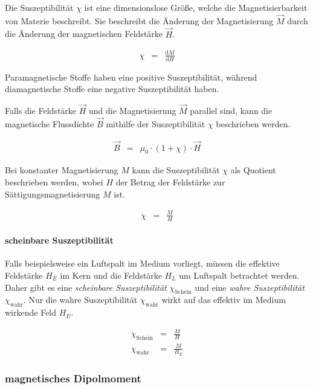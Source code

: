 \documentclass[12pt,a4paper]{scrartcl}
\numberwithin{equation}{section} %
\renewcommand{\[}{} %
\renewcommand{\]}{\noindent} %
\begin{document}
Die Suszeptibilität \(\chi\) ist eine dimensionslose Größe, welche die
Magnetisierbarkeit von Materie beschreibt. Sie beschreibt die Änderung
der Magnetisierung \(\vec M\) durch die Änderung der magnetischen
Feldstärke \(\vec H\).

\[
\begin{eqnarray}
    \chi &=& \frac{\mathrm dM}{\mathrm dH}
\end{eqnarray}
\]

Paramagnetische Stoffe haben eine positive Suszeptibilität, während
diamagnetische Stoffe eine negative Suszeptibilität haben.

Falls die Feldstärke \(\vec H\) und die Magnetisierung \(\vec M\)
parallel sind, kann die magnetische Flussdichte \(\vec B\) mithilfe der
Suszeptibilität \(\chi\) beschrieben werden.

\[
\begin{eqnarray}
    \vec B &=& \mu_0\cdot (1+\chi) \cdot \vec H
\end{eqnarray}
\]

Bei konstanter Magnetisierung \(M\) kann die Suszeptibilität \(\chi\)
als Quotient beschrieben werden, wobei \(H\) der Betrag der Feldstärke
zur Sättigungsmagnetisierung \(M\) ist.

\[
\begin{eqnarray}
    \chi &=& \frac{M}{H}
\end{eqnarray}
\]

\hypertarget{scheinbare-suszeptibilituxe4t}{%
\paragraph{scheinbare
Suszeptibilität}\label{scheinbare-suszeptibilituxe4t}}

Falls beispielsweise ein Luftspalt im Medium vorliegt, müssen die
effektive Feldstärke \(H_E\) im Kern und die Feldstärke \(H_L\) um
Luftspalt betrachtet werden. Daher gibt es eine \emph{scheinbare
Suszeptibilität} \(\chi_\mathrm{Schein}\) und eine \emph{wahre
Suszeptibilität} \(\chi_\mathrm{wahr}\). Nur die wahre Suszeptibilität
\(\chi_\mathrm{wahr}\) wirkt auf das effektiv im Medium wirkende Feld
\(H_E\).

\[
\begin{eqnarray}
    \chi_\mathrm{Schein} &=& \frac{M}{H} \\
    \chi_\mathrm{wahr} &=& \frac{M}{H_E}
\end{eqnarray}
\]

\hypertarget{magnetisches-dipolmoment}{%
\subsubsection{magnetisches
Dipolmoment}\label{magnetisches-dipolmoment}}
\end{document}
